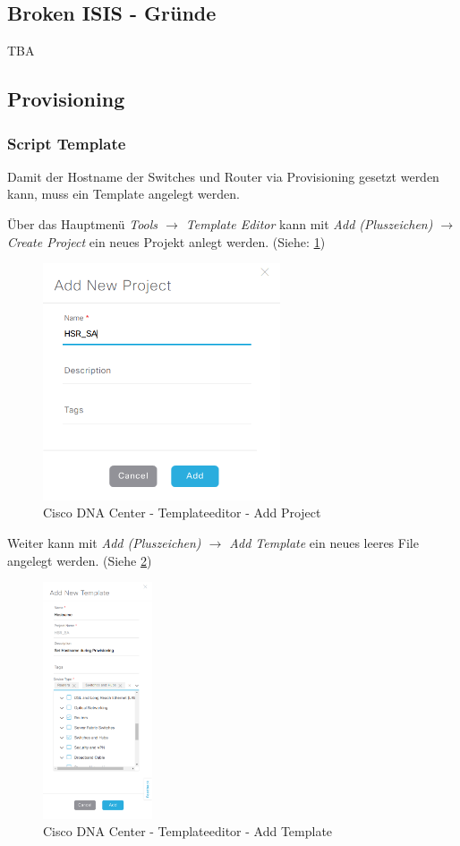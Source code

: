 \subsection{Broken ISIS - Gründe}
TBA

\subsection{Provisioning}

\subsubsection{Script Template}
\label{Script Template}
Damit der Hostname der Switches und Router via Provisioning gesetzt werden kann, muss ein Template angelegt werden.

Über das Hauptmenü \textit{Tools $\rightarrow$ Template Editor} kann mit \textit{Add (Pluszeichen) $\rightarrow$ Create Project} ein neues Projekt anlegt werden. (Siehe: \ref{fig:dna-center-template-editor-add-project})

\begin{figure}[H]
	\centering
	\includegraphics[height=7cm]{img/secondtry/dna-center-template-editor-add-project.png}
	\caption{Cisco DNA Center - Templateeditor - Add Project}
	\label{fig:dna-center-template-editor-add-project}
\end{figure}

Weiter kann mit \textit{Add (Pluszeichen) $\rightarrow$ Add Template} ein neues leeres File angelegt werden. (Siehe \ref{fig:dna-center-template-editor-add-template})

\begin{figure}[H]
	\centering
	\includegraphics[height=7cm]{img/secondtry/dna-center-template-editor-add-template.png}
	\caption{Cisco DNA Center - Templateeditor - Add Template}
	\label{fig:dna-center-template-editor-add-template}
\end{figure}

